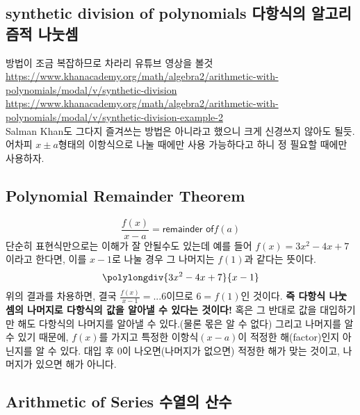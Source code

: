 \documentclass{article}
\begin{document}
\subsection{synthetic division of polynomials 다항식의 알고리즘적 나눗셈}
방법이 조금 복잡하므로 차라리 유튜브 영상을 볼것
\vspace{12pt}\\
\url{https://www.khanacademy.org/math/algebra2/arithmetic-with-polynomials/modal/v/synthetic-division}
\vspace{12pt}\\
\url{https://www.khanacademy.org/math/algebra2/arithmetic-with-polynomials/modal/v/synthetic-division-example-2}\\
Salman Khan도 그다지 즐겨쓰는 방법은 아니라고 했으니 크게 신경쓰지 않아도 될듯. 어차피 $x\pm a$형태의 이항식으로 나눌 때에만 사용 가능하다고 하니 정 필요할 때에만 사용하자.

\subsection{Polynomial Remainder Theorem}
$$\frac{f(x)}{x-a}={\textsf{remainder of}} f(a)$$
단순히 표현식만으로는 이해가 잘 안될수도 있는데 예를 들어 $f(x) = 3x^{2}-4x+7$이라고 한다면, 이를 $x-1$로 나눌 경우 그 나머지는 $f(1)$과 같다는 뜻이다.
$$\polylongdiv{3x^{2}-4x+7}{x-1}$$
위의 결과를 차용하면, 결국 $\frac{f(x)}{x-1}=...6$이므로 $6=f(1)$인 것이다. \textbf{즉 다항식 나눗셈의 나머지로 다항식의 값을 알아낼 수 있다는 것이다!} 혹은 그 반대로 값을 대입하기만 해도 다항식의 나머지를 알아낼 수 있다.(물론 몫은 알 수 없다) 그리고 나머지를 알 수 있기 때문에, $f(x)$를 가지고 특정한 이항식$(x-a)$이 적정한 해(factor)인지 아닌지를 알 수 있다. 대입 후 0이 나오면(나머지가 없으면) 적정한 해가 맞는 것이고, 나머지가 있으면 해가 아니다.

\subsection{Arithmetic of Series 수열의 산수}
\end{document}
